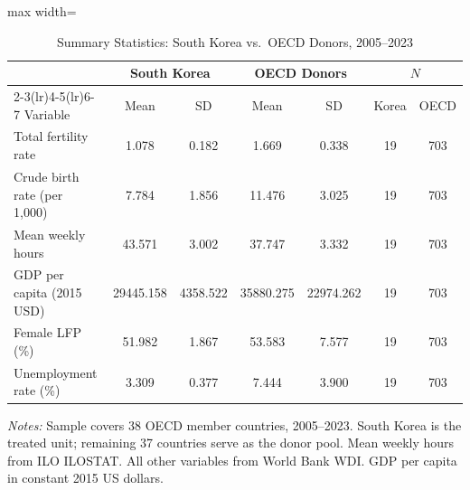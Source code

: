 \begin{table}[t]
\centering
\caption{Summary Statistics: South Korea vs.\ OECD Donors, 2005--2023}
\label{tab:sumstats}
\begin{adjustbox}{max width=\textwidth}
\begin{tabular}{lcccccc}
\toprule
 & \multicolumn{2}{c}{South Korea} & \multicolumn{2}{c}{OECD Donors} & \multicolumn{2}{c}{$N$} \\
\cmidrule(lr){2-3}\cmidrule(lr){4-5}\cmidrule(lr){6-7}
 Variable & Mean & SD & Mean & SD & Korea & OECD \\
\midrule
Total fertility rate & 1.078 & 0.182 & 1.669 & 0.338 & 19 & 703 \\
Crude birth rate (per 1,000) & 7.784 & 1.856 & 11.476 & 3.025 & 19 & 703 \\
Mean weekly hours & 43.571 & 3.002 & 37.747 & 3.332 & 19 & 703 \\
GDP per capita (2015 USD) & 29445.158 & 4358.522 & 35880.275 & 22974.262 & 19 & 703 \\
Female LFP (\%) & 51.982 & 1.867 & 53.583 & 7.577 & 19 & 703 \\
Unemployment rate (\%) & 3.309 & 0.377 & 7.444 & 3.900 & 19 & 703 \\
\bottomrule
\end{tabular}
\end{adjustbox}
\begin{minipage}{0.95\textwidth}
\footnotesize\textit{Notes:} Sample covers 38 OECD member countries, 2005--2023. South Korea is the treated unit; remaining 37 countries serve as the donor pool. Mean weekly hours from ILO ILOSTAT. All other variables from World Bank WDI. GDP per capita in constant 2015 US dollars.
\end{minipage}
\end{table}
